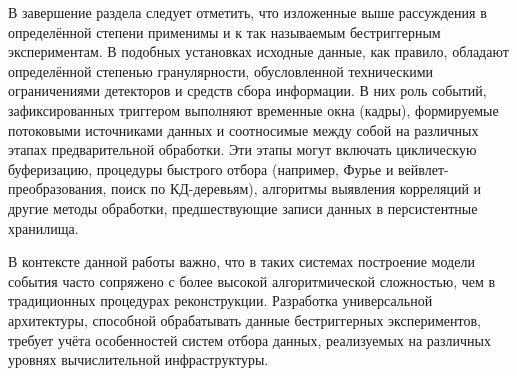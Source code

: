 В завершение раздела следует отметить, что изложенные выше рассуждения в
определённой степени применимы и к так называемым бестриггерным
экспериментам. В подобных установках исходные данные, как правило,
обладают определённой степенью гранулярности, обусловленной
техническими ограничениями детекторов и средств сбора
информации. В них роль событий, зафиксированных триггером
выполняют временные окна (кадры), формируемые потоковыми источниками
данных и соотносимые между собой на различных этапах предварительной
обработки. Эти этапы могут включать циклическую буферизацию,
процедуры быстрого отбора (например, Фурье и вейвлет-преобразования, поиск по
КД-деревьям), алгоритмы выявления корреляций и другие методы
обработки, предшествующие записи данных в персистентные хранилища.

В контексте данной работы важно, что в таких системах построение
модели события часто сопряжено с более высокой алгоритмической сложностью,
чем в традиционных процедурах реконструкции. Разработка универсальной
архитектуры, способной обрабатывать данные бестриггерных
экспериментов, требует учёта особенностей систем отбора
данных, реализуемых на различных уровнях вычислительной инфраструктуры.
